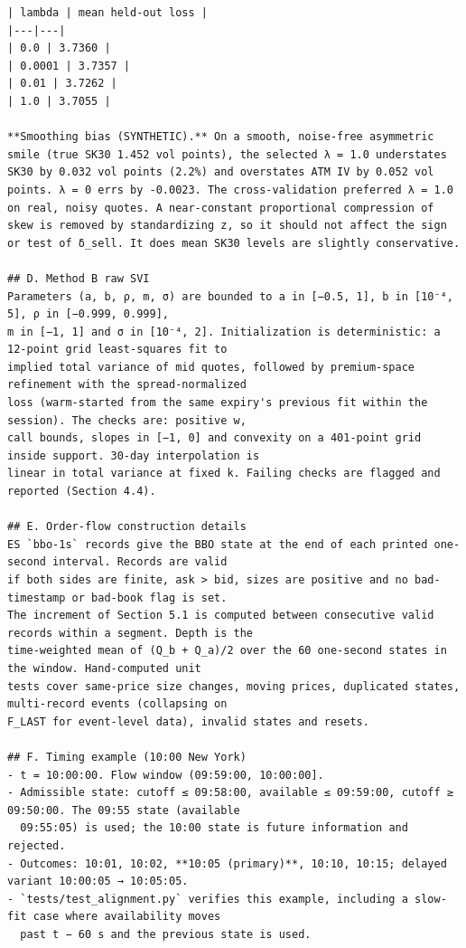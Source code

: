 \documentclass[11pt]{article}
\begin{document}
\begin{verbatim}
| lambda | mean held-out loss |
|---|---|
| 0.0 | 3.7360 |
| 0.0001 | 3.7357 |
| 0.01 | 3.7262 |
| 1.0 | 3.7055 |

**Smoothing bias (SYNTHETIC).** On a smooth, noise-free asymmetric smile (true SK30 1.452 vol points), the selected λ = 1.0 understates SK30 by 0.032 vol points (2.2%) and overstates ATM IV by 0.052 vol points. λ = 0 errs by -0.0023. The cross-validation preferred λ = 1.0 on real, noisy quotes. A near-constant proportional compression of skew is removed by standardizing z, so it should not affect the sign or test of δ_sell. It does mean SK30 levels are slightly conservative.

## D. Method B raw SVI
Parameters (a, b, ρ, m, σ) are bounded to a in [−0.5, 1], b in [10⁻⁴, 5], ρ in [−0.999, 0.999],
m in [−1, 1] and σ in [10⁻⁴, 2]. Initialization is deterministic: a 12-point grid least-squares fit to
implied total variance of mid quotes, followed by premium-space refinement with the spread-normalized
loss (warm-started from the same expiry's previous fit within the session). The checks are: positive w,
call bounds, slopes in [−1, 0] and convexity on a 401-point grid inside support. 30-day interpolation is
linear in total variance at fixed k. Failing checks are flagged and reported (Section 4.4).

## E. Order-flow construction details
ES `bbo-1s` records give the BBO state at the end of each printed one-second interval. Records are valid
if both sides are finite, ask > bid, sizes are positive and no bad-timestamp or bad-book flag is set.
The increment of Section 5.1 is computed between consecutive valid records within a segment. Depth is the
time-weighted mean of (Q_b + Q_a)/2 over the 60 one-second states in the window. Hand-computed unit
tests cover same-price size changes, moving prices, duplicated states, multi-record events (collapsing on
F_LAST for event-level data), invalid states and resets.

## F. Timing example (10:00 New York)
- t = 10:00:00. Flow window (09:59:00, 10:00:00].
- Admissible state: cutoff ≤ 09:58:00, available ≤ 09:59:00, cutoff ≥ 09:50:00. The 09:55 state (available
  09:55:05) is used; the 10:00 state is future information and rejected.
- Outcomes: 10:01, 10:02, **10:05 (primary)**, 10:10, 10:15; delayed variant 10:00:05 → 10:05:05.
- `tests/test_alignment.py` verifies this example, including a slow-fit case where availability moves
  past t − 60 s and the previous state is used.


\end{verbatim}
\end{document}

